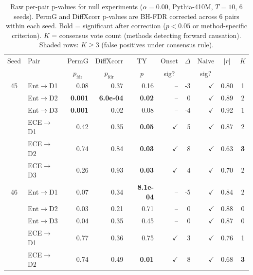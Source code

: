 \begin{table}[t]
\centering
\caption{Raw per-pair p-values for null experiments ($\alpha{=}0.00$, Pythia-410M, $T{=}10$, 6 seeds). 
PermG and DiffXcorr p-values are BH-FDR corrected across 6 pairs within each seed.
Bold = significant after correction ($p < 0.05$ or method-specific criterion).
$K$ = consensus vote count (methods detecting forward causation).
Shaded rows: $K \geq 3$ (false positives under consensus rule).}
\label{tab:fpr_transparency}
\small
\setlength{\tabcolsep}{3.5pt}
\begin{tabular}{cl rrr rr rr c}
\toprule
Seed & Pair & \multicolumn{1}{c}{PermG} & \multicolumn{1}{c}{DiffXcorr} & \multicolumn{1}{c}{TY} & \multicolumn{1}{c}{Onset} & \multicolumn{1}{c}{$\Delta$} & \multicolumn{1}{c}{Naive} & \multicolumn{1}{c}{$|r|$} & $K$ \\
 & & \multicolumn{1}{c}{$p_\text{fdr}$} & \multicolumn{1}{c}{$p_\text{fdr}$} & \multicolumn{1}{c}{$p$} & \multicolumn{1}{c}{sig?} & & \multicolumn{1}{c}{sig?} & & \\
\midrule
45 & Ent$\to$D1 & 0.08 & 0.37 & 0.16 & -- & -3 & $\checkmark$ & 0.80 & 1 \\
 & Ent$\to$D2 & \textbf{0.001} & \textbf{6.0e-04} & \textbf{0.02} & -- & 0 & $\checkmark$ & 0.89 & 2 \\
 & Ent$\to$D3 & \textbf{0.001} & 0.02 & 0.08 & -- & -4 & $\checkmark$ & 0.92 & 1 \\
 & ECE$\to$D1 & 0.42 & 0.35 & \textbf{0.05} & $\checkmark$ & 5 & $\checkmark$ & 0.87 & 2 \\
\rowcolor{gray!15}  & ECE$\to$D2 & 0.74 & 0.84 & \textbf{0.03} & $\checkmark$ & 8 & $\checkmark$ & 0.63 & \textbf{3} \\
 & ECE$\to$D3 & 0.26 & 0.93 & \textbf{0.03} & $\checkmark$ & 4 & $\checkmark$ & 0.70 & 2 \\
\midrule
46 & Ent$\to$D1 & 0.07 & 0.34 & \textbf{8.1e-04} & -- & -5 & $\checkmark$ & 0.84 & 2 \\
 & Ent$\to$D2 & 0.03 & 0.21 & 0.71 & -- & 0 & $\checkmark$ & 0.88 & 0 \\
 & Ent$\to$D3 & 0.04 & 0.35 & 0.45 & -- & 0 & $\checkmark$ & 0.87 & 0 \\
 & ECE$\to$D1 & 0.77 & 0.36 & 0.75 & $\checkmark$ & 3 & $\checkmark$ & 0.76 & 1 \\
\rowcolor{gray!15}  & ECE$\to$D2 & 0.74 & 0.49 & \textbf{0.01} & $\checkmark$ & 8 & $\checkmark$ & 0.68 & \textbf{3} \\

\end{tabular}
\end{table}

